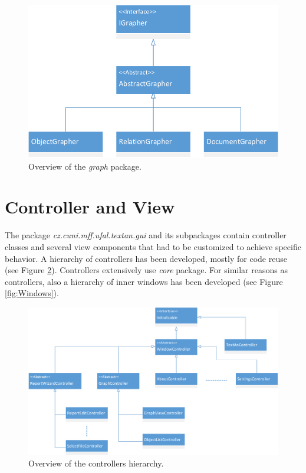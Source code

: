 \begin{figure}[!htb]
        \centering
        \includegraphics[width=\textwidth]{Images/Graph}
        \caption{Overview of the \emph{graph} package.}
        \label{fig:Graph}
\end{figure}

\section{Controller and View}

The package \emph{cz.cuni.mff.ufal.textan.gui} and its subpackages contain
controller classes and several view components that had to be customized to
achieve specific behavior. A hierarchy of controllers has been developed, mostly
for code reuse (see Figure \ref{fig:Controllers}). Controllers extensively use
\emph{core} package. For similar reasons as controllers, also a hierarchy of
inner windows has been developed (see Figure \ref{fig:Windows}).

\begin{figure}[!htb]
        \centering
        \includegraphics[width=\textwidth]{Images/Controllers}
        \caption{Overview of the controllers hierarchy.}
        \label{fig:Controllers}
\end{figure}

